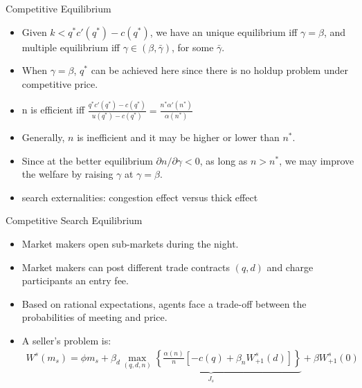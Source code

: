 \documentclass{beamer}
\begin{document}
\begin{frame}{Competitive Equilibrium}
    \begin{itemize}
        \item Given $k<q^{*}c'(q^{*})-c(q^{*})$, we have an unique equilibrium iff $\gamma=\beta$, and multiple equilibrium iff  $\gamma\in(\beta,\bar{\gamma})$, for some $\bar{\gamma}$.
        \item When $\gamma=\beta$, $q^{*}$ can be achieved here since there is no holdup problem under competitive price.
        \item n is efficient iff $\frac{q^{*}c'(q^{*})-c(q^{*})}{ u(q^{*})-c(q^{*})} = \frac{n^{*} \alpha'(n^{*})}{\alpha(n^{*})} $ \item Generally, $n$ is inefficient and it may be higher or lower than $n^{*}$.
        \item Since at the better equilibrium $\partial n/\partial \gamma<0$, as long as $n>n^{*}$, we may improve the welfare by raising $\gamma$ at $\gamma=\beta$.
        \item search externalities: congestion effect versus thick effect
        
    \end{itemize}
\end{frame}

\begin{frame}{Competitive Search Equilibrium}
    \begin{itemize}
        \item Market makers open sub-markets during the night.
        \item Market makers can post different trade contracts $(q,d)$ and charge participants an entry fee.
        \item Based on rational expectations, agents face a trade-off between the probabilities of meeting and price.
        \item A seller's problem is:
        \begin{align*}
            W^{s}(m_{s}) = \phi m_{s} + \beta_{d} \underbrace{\max_{(q,d,n)}\left\{\frac{\alpha(n)}{n}\left[-c(q)+\beta_{n}W_{+1}^{s}(d)\right]\right\} }_{J_{s}}+\beta W_{+1}^{s}(0) 
        \end{align*}
    \end{itemize}
\end{frame}
\end{document}
